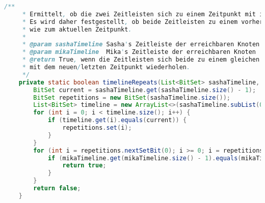 \documentclass[a4paper,10pt,ngerman]{scrartcl}
\begin{document}
	
	\begin{lstlisting}[frame=single,language=Java,title=Methode timelineRepeats,breaklines=true]
    /**
     * Ermittelt, ob die zwei Zeitleisten sich zu einem Zeitpunkt mit ihrem letzten Eintrag wiederholen.
     * Es wird daher festgestellt, ob beide Zeitleisten zu einem vorherigen Zeitpunkt an den genau gleichen Knoten waren,
     * wie zum aktuellen Zeitpunkt.
     *
     * @param sashaTimeline Sasha's Zeitleiste der erreichbaren Knoten
     * @param mikaTimeline  Mika's Zeitleiste der erreichbaren Knoten
     * @return True, wenn die Zeitleisten sich beide zu einem gleichen Zeitpunkt
     * mit dem neuen/letzten Zeitpunkt wiederholen.
     */
    private static boolean timelineRepeats(List<BitSet> sashaTimeline, List<BitSet> mikaTimeline) {
        BitSet current = sashaTimeline.get(sashaTimeline.size() - 1);
        BitSet repetitions = new BitSet(sashaTimeline.size());
        List<BitSet> timeline = new ArrayList<>(sashaTimeline.subList(0, sashaTimeline.size() - 1));
        for (int i = 0; i < timeline.size(); i++) {
            if (timeline.get(i).equals(current)) {
                repetitions.set(i);
            }
        }
        for (int i = repetitions.nextSetBit(0); i >= 0; i = repetitions.nextSetBit(i + 1)) {
            if (mikaTimeline.get(mikaTimeline.size() - 1).equals(mikaTimeline.get(i))) {
                return true;
            }
        }
        return false;
    }
	\end{lstlisting}
	
	
	
	
\end{document}
